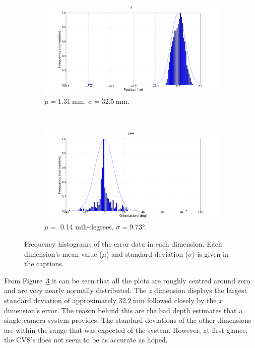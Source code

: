 \begin{figure}
  \begin{subfigure}{0.48\textwidth}
     \includegraphics[clip, trim = 120 0 120 0, width=\textwidth]{figures/chapter3/norm_z.pdf}
     \caption{$\mu = \SI{1.31}{\mm}$, $\sigma = \SI{32.5}{\mm}$.}
  \label{fig:norm-z}
  \end{subfigure}
~
\begin{subfigure}{0.48\textwidth}
     \includegraphics[clip, trim = 120 0 120 0, width=\textwidth]{figures/chapter3/norm_yaw.pdf}
     \caption{$\mu = $ 0.14 mili-degrees, $\sigma = \ang{9.73}$. }
  \label{fig:norm-yaw}
  \end{subfigure}
  \caption[Frequency histograms of the error data in each dimension.]{Frequency histograms of the error data in each dimension. Each dimension's mean value ($\mu$) and standard deviation ($\sigma$) is given in the captions. }
  \label{fig:err-norm}
\end{figure}

From Figure~\ref{fig:err-norm} it can be seen that all the plots are roughly centred around zero and are very nearly normally distributed. The $z$ dimension displays the largest standard deviation of approximately $\SI{32.2}{\mm}$ followed closely by the $x$ dimension's error. The reason behind this are the bad depth estimates that a single camera system provides. The standard deviations of the other dimensions are within the range that was expected of the system. However, at first glance, the CVS's does not seem to be as accurate as hoped. 

